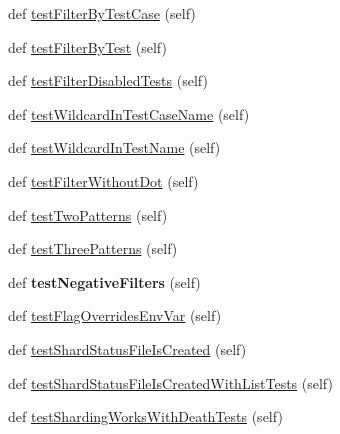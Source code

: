 \begin{DoxyCompactItemize}
\item 
def \hyperlink{classgoogletest-filter-unittest_1_1GTestFilterUnitTest_ac67334a27bf7aaf4d817d41e6bcd4469}{test\+Filter\+By\+Test\+Case} (self)
\item 
def \hyperlink{classgoogletest-filter-unittest_1_1GTestFilterUnitTest_a5665345aa2e94412fd65b19bc5077342}{test\+Filter\+By\+Test} (self)
\item 
def \hyperlink{classgoogletest-filter-unittest_1_1GTestFilterUnitTest_ada479753ed1c6007647252922f713ffc}{test\+Filter\+Disabled\+Tests} (self)
\item 
def \hyperlink{classgoogletest-filter-unittest_1_1GTestFilterUnitTest_a6bc13581aeb86a199706fd2592b5b5e5}{test\+Wildcard\+In\+Test\+Case\+Name} (self)
\item 
def \hyperlink{classgoogletest-filter-unittest_1_1GTestFilterUnitTest_a57c51a39e4e5578dc6e0a0dd47c2875c}{test\+Wildcard\+In\+Test\+Name} (self)
\item 
def \hyperlink{classgoogletest-filter-unittest_1_1GTestFilterUnitTest_a3a7d87e91ab92004b55affc8a0f76305}{test\+Filter\+Without\+Dot} (self)
\item 
def \hyperlink{classgoogletest-filter-unittest_1_1GTestFilterUnitTest_a7b2e7e1424bd6be9cbd15a401017c442}{test\+Two\+Patterns} (self)
\item 
def \hyperlink{classgoogletest-filter-unittest_1_1GTestFilterUnitTest_aab0836fe1e7c7c6af6b8b94f08475d3b}{test\+Three\+Patterns} (self)
\item 
\mbox{\label{classgoogletest-filter-unittest_1_1GTestFilterUnitTest_a8484038c90290d2a4a50a3ab3601436e}} 
def {\bfseries test\+Negative\+Filters} (self)
\item 
def \hyperlink{classgoogletest-filter-unittest_1_1GTestFilterUnitTest_a3cfc062fbcc396bfaa94184e10e3ae39}{test\+Flag\+Overrides\+Env\+Var} (self)
\item 
def \hyperlink{classgoogletest-filter-unittest_1_1GTestFilterUnitTest_a48fd50fa58d23ba0521a9388aea0c688}{test\+Shard\+Status\+File\+Is\+Created} (self)
\item 
def \hyperlink{classgoogletest-filter-unittest_1_1GTestFilterUnitTest_a7c436b2599ace8d6e32d17fd08a98178}{test\+Shard\+Status\+File\+Is\+Created\+With\+List\+Tests} (self)
\item 
def \hyperlink{classgoogletest-filter-unittest_1_1GTestFilterUnitTest_a8998f6f4842fa2cbde0428fa0c4ba437}{test\+Sharding\+Works\+With\+Death\+Tests} (self)
\end{DoxyCompactItemize}


